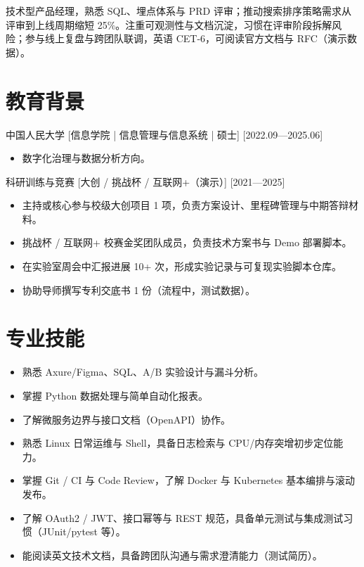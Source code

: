 \documentclass{resume-photo}
\begin{document}

\ResumeTitle

\noindent 技术型产品经理，熟悉 SQL、埋点体系与 PRD 评审；推动搜索排序策略需求从评审到上线周期缩短 25\%。注重可观测性与文档沉淀，习惯在评审阶段拆解风险；参与线上复盘与跨团队联调，英语 CET-6，可阅读官方文档与 RFC（演示数据）。

\section{教育背景}
\ResumeItem
{中国人民大学}
[\textnormal{信息学院 | 信息管理与信息系统 | 硕士}]
[2022.09—2025.06]

\begin{itemize}
  \item 数字化治理与数据分析方向。
\end{itemize}


\ResumeItem
{科研训练与竞赛}
[\textnormal{大创 / 挑战杯 / 互联网+（演示）}]
[2021—2025]

\begin{itemize}
  \item 主持或核心参与校级大创项目 1 项，负责方案设计、里程碑管理与中期答辩材料。
  \item 挑战杯 / 互联网+ 校赛金奖团队成员，负责技术方案书与 Demo 部署脚本。
  \item 在实验室周会中汇报进展 10+ 次，形成实验记录与可复现实验脚本仓库。
  \item 协助导师撰写专利交底书 1 份（流程中，测试数据）。
\end{itemize}



\section{专业技能}
\begin{itemize}
  \item 熟悉 Axure/Figma、SQL、A/B 实验设计与漏斗分析。
  \item 掌握 Python 数据处理与简单自动化报表。
  \item 了解微服务边界与接口文档（OpenAPI）协作。
  \item 熟悉 Linux 日常运维与 Shell，具备日志检索与 CPU/内存突增初步定位能力。
  \item 掌握 Git / CI 与 Code Review，了解 Docker 与 Kubernetes 基本编排与滚动发布。
  \item 了解 OAuth2 / JWT、接口幂等与 REST 规范，具备单元测试与集成测试习惯（JUnit/pytest 等）。
  \item 能阅读英文技术文档，具备跨团队沟通与需求澄清能力（测试简历）。
\end{itemize}
\end{document}
